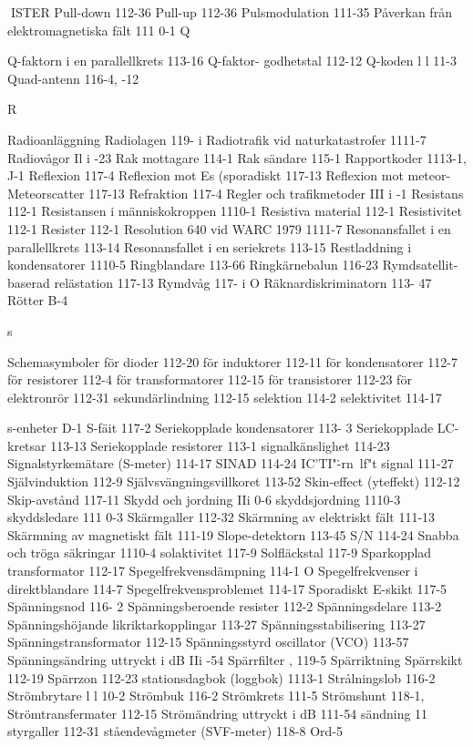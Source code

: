 ISTER
Pull-down 112-36
Pull-up 112-36
Pulsmodulation 111-35
Påverkan från elektromagnetiska fält 111 0-1
Q

Q-faktorn i en parallellkrets 113-16
Q-faktor- godhetstal 112-12
Q-koden l l 11-3
Quad-antenn 116-4, -12

R

Radioanläggning
Radiolagen 119- i
Radiotrafik vid naturkatastrofer 1111-7
Radiovågor Il i -23
Rak mottagare 114-1
Rak sändare 115-1
Rapportkoder 1113-1, J-1
Reflexion 117-4
Reflexion mot Es (sporadiskt
117-13
Reflexion mot meteor- Meteorscatter 117-13
Refraktion 117-4
Regler och trafikmetoder III i -1
Resistans 112-1
Resistansen i människokroppen 1110-1
Resistiva material 112-1
Resistivitet 112-1
Resister 112-1
Resolution 640 vid WARC 1979 1111-7
Resonansfallet i en parallellkrets 113-14
Resonansfallet i en seriekrets 113-15
Restladdning i kondensatorer 1110-5
Ringblandare 113-66
Ringkärnebalun 116-23
Rymdsatellit-baserad relästation 117-13
Rymdvåg 117- i O
Räknardiskriminatorn 113- 47
Rötter B-4

s

Schemasymboler
för dioder 112-20
för induktorer 112-11
för kondensatorer 112-7
för resistorer 112-4
för transformatorer 112-15
för transistorer 112-23
för elektronrör 112-31
sekundärlindning 112-15
selektion 114-2
selektivitet 114-17

s-enheter D-1
S-fäit 117-2
Seriekopplade kondensatorer 113- 3
Seriekopplade LC-kretsar 113-13
Seriekopplade resistorer 113-1
signalkänslighet 114-23
Signalstyrkemätare (S-meter) 114-17
SINAD 114-24
IC'TI"\.-rn~lf"t signal 111-27
Självinduktion 112-9
Självsvängningsvillkoret 113-52
Skin-effect (yteffekt) 112-12
Skip-avstånd 117-11
Skydd och jordning IIi 0-6
skyddsjordning 1110-3
skyddsledare 111 0-3
Skärmgaller 112-32
Skärmning av elektriskt fält 111-13
Skärmning av magnetiskt fält 111-19
Slope-detektorn 113-45
S/N 114-24
Snabba och tröga säkringar 1110-4
solaktivitet 117-9
Solfläckstal 117-9
Sparkopplad transformator 112-17
Spegelfrekvensdämpning 114-1 O
Spegelfrekvenser i direktblandare 114-7
Spegelfrekvensproblemet 114-17
Sporadiskt E-skikt 117-5
Spänningsnod 116- 2
Spänningsberoende resister 112-2
Spänningsdelare 113-2
Spänningshöjande likriktarkopplingar 113-27
Spänningsstabilisering 113-27
Spänningstransformator 112-15
Spänningsstyrd oscillator (VCO) 113-57
Spänningsändring uttryckt i dB IIi -54
Spärrfilter
, 119-5
Spärriktning
Spärrskikt 112-19
Spärrzon 112-23
stationsdagbok (loggbok) 1113-1
Strålningslob 116-2
Strömbrytare l l 10-2
Strömbuk 116-2
Strömkrets 111-5
Strömshunt 118-1,
Strömtransfermater 112-15
Strömändring uttryckt i dB 111-54
sändning 11
styrgaller 112-31
ståendevågmeter (SVF-meter) 118-8
Ord-5

